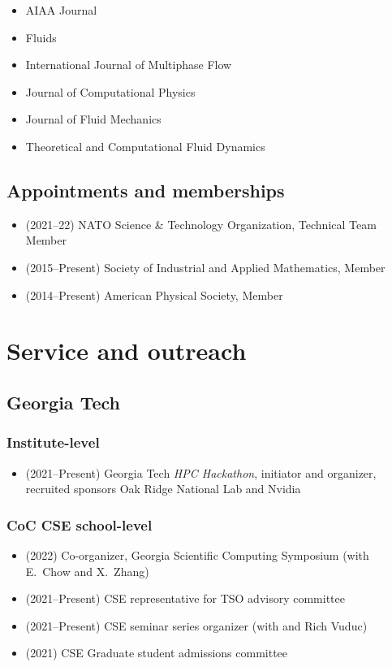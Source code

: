 \begin{itemize}
    \item AIAA Journal
    \item Fluids
    \item International Journal of Multiphase Flow
    \item Journal of Computational Physics
    \item Journal of Fluid Mechanics
    \item Theoretical and Computational Fluid Dynamics
\end{itemize}

\subsection{Appointments and memberships}

\begin{itemize}
    \item (2021--22) NATO Science \& Technology Organization, Technical Team Member
    \item (2015--Present) Society of Industrial and Applied Mathematics, Member
    \item (2014--Present) American Physical Society, Member
\end{itemize}

\section{Service and outreach}

\subsection{Georgia Tech}

\subsubsection{Institute-level}
\begin{itemize}
    \item (2021--Present) Georgia Tech \textit{HPC Hackathon}, initiator and organizer, recruited sponsors Oak Ridge National Lab and Nvidia 
\end{itemize}

\subsubsection{CoC CSE school-level}
\begin{itemize}
    \item (2022) Co-organizer, Georgia Scientific Computing Symposium (with E.\ Chow and X.\ Zhang)
    \item (2021--Present) CSE representative for TSO advisory committee
    \item (2021--Present) CSE seminar series organizer (with \Florian and Rich Vuduc)
    \item (2021) CSE Graduate student admissions committee
\end{itemize}

